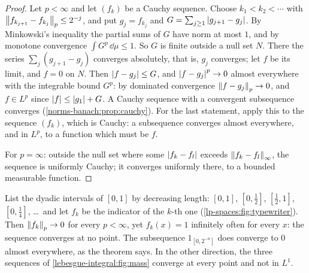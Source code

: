 \begin{notechapter}
\begin{proof}
Let $p < \infty$ and let $(f_k)$ be a Cauchy sequence. Choose
$k_1 < k_2 < \cdots$ with $\left\|f_{k_{j+1}} - f_{k_j}\right\|_p\leq2^{-j}$,
and put $g_j = f_{k_j}$ and $G = \sum_{j\geq1}\left|g_{j+1} - g_j\right|$. By
Minkowski's inequality the partial sums of $G$ have norm at most $1$,
and by monotone convergence $\int G^p\,\dd\mu\leq1$. So $G$ is finite
outside a null set $N$. There the series $\sum_j(g_{j+1} - g_j)$
converges absolutely, that is, $g_j$ converges; let $f$ be its limit,
and $f = 0$ on $N$. Then $\left|f - g_j\right|\leq G$, and
$\left|f - g_j\right|^p\to0$ almost everywhere with the integrable bound $G^p$:
by dominated convergence $\left\|f - g_j\right\|_p\to0$, and $f\in L^p$ since
$\left|f\right|\leq\left|g_1\right| + G$. A Cauchy sequence with a convergent
subsequence converges (\cref{norms-banach:prop:cauchy}). For the last
statement, apply this to the sequence $(f_k)$, which is Cauchy: a
subsequence converges almost everywhere, and in $L^p$, to a function
which must be $f$.

For $p = \infty$: outside the null set where some
$\left|f_k - f_l\right|$ exceeds $\left\|f_k - f_l\right\|_\infty$, the sequence is
uniformly Cauchy; it converges uniformly there, to a bounded
measurable function.
\end{proof}

\begin{pitfall}
List the dyadic intervals of $[0, 1]$ by decreasing length:
$[0, 1]$, $[0, \frac12]$, $[\frac12, 1]$, $[0, \frac14]$, \dots\ and
let $f_k$ be the indicator of the $k$-th one
(\cref{lp-spaces:fig:typewriter}). Then $\left\|f_k\right\|_p\to0$ for every
$p < \infty$, yet $f_k(x) = 1$ infinitely often for every $x$: the
sequence converges at no point. The subsequence $1_{[0, 2^{-n}]}$ does
converge to $0$ almost everywhere, as the theorem says. In the other
direction, the three sequences of \cref{lebesgue-integral:fig:mass}
converge at every point and not in $L^1$.
\end{pitfall}


\end{notechapter}
